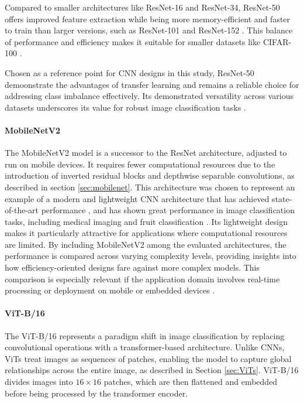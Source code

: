 Compared to smaller architectures like ResNet-16 and ResNet-34, ResNet-50 offers improved feature extraction while being more memory-efficient and faster to train than larger versions, such as ResNet-101 and ResNet-152 \cite{he2015deepresiduallearningimage}. This balance of performance and efficiency makes it suitable for smaller datasets like CIFAR-100 \cite{10083966}.

Chosen as a reference point for CNN designs in this study, ResNet-50 demoonstrate the advantages of transfer learning and remains a reliable choice for addressing class imbalance effectively. Its demonstrated versatility across various datasets underscores its value for robust image classification tasks \cite{he2015deepresiduallearningimage,yun2019cutmixregularizationstrategytrain,}.

\paragraph{MobileNetV2}
The MobileNetV2 model  is a successor to the ResNet architecture, adjusted to run on mobile devices. It requires fewer computational resources due to the introduction of inverted residual blocks and depthwise separable convolutions, as described in section \ref{sec:mobilenet}. This architecture was chosen to represent an example of a modern and lightweight CNN architecture that has achieved state-of-the-art performance \cite{sandler2018mobilenetv2}, and has shown great performance in image classification tasks, including medical imaging \cite{surya2024enhancedbreastcancertumor} and fruit classification \cite{10112802, shahi2022fruit}. Its lightweight design makes it particularly attractive for applications where computational resources are limited. By including MobileNetV2 among the evaluated architectures, the performance is compared across varying complexity levels, providing insights into how efficiency-oriented designs fare against more complex models. This comparison is especially relevant if the application domain involves real-time processing or deployment on mobile or embedded devices \cite{sandler2018mobilenetv2}. 


\paragraph{ViT-B/16}
The ViT-B/16 \cite{dosovitskiy2021imageworth16x16words} represents a paradigm shift in image classification by replacing convolutional operations with a transformer-based architecture. Unlike CNNs, ViTs treat images as sequences of patches, enabling the model to capture global relationships across the entire image, as described in Section \ref{sec:ViTs}. ViT-B/16 divides images into $16\times 16$ patches, which are then flattened and embedded before being processed by the transformer encoder.

